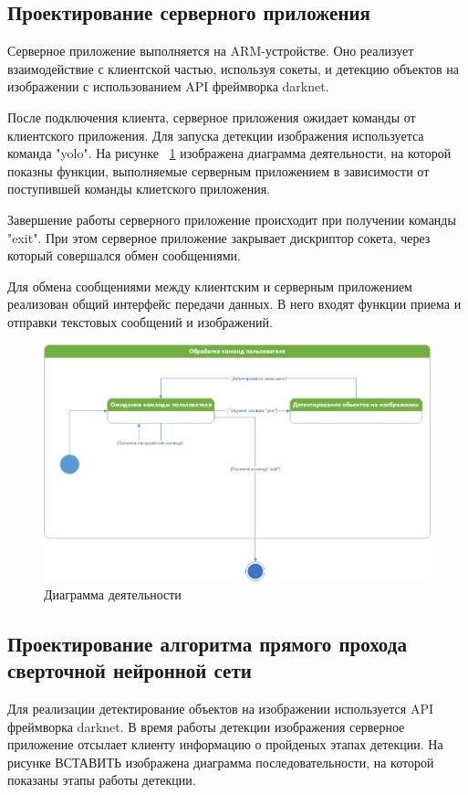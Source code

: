 \documentclass[a4paper,english,russian]{G2-105}
\begin{document}
\subsection{Проектирование серверного приложения}
\par Серверное приложение выполняется на ARM-устройстве. Оно реализует взаимодействие с клиентской частью, используя сокеты, и детекцию объектов на изображении с использованием API фреймворка darknet.
\par После подключения клиента, серверное приложения ожидает команды от клиентского приложения. Для запуска детекции изображения используетса команда "yolo". На рисунке ~\ref{state} изображена диаграмма деятельности, на которой показны функции, выполняемые серверным приложением в зависимости от поступившей команды клиетского приложения.
\par Завершение работы серверного приложение происходит при получении команды "exit". При этом серверное приложение закрывает дискриптор сокета, через который совершался обмен сообщениями.
\par Для обмена сообщениями между клиентским и серверным приложением реализован общий интерфейс передачи данных. В него входят функции приема и отправки текстовых сообщений и изображений.
\begin{figure}
    \includegraphics[width=0.6\linewidth]{statediagramserver.png}
    \caption{Диаграмма деятельности}
	\label{state}
\end{figure}
\ttl
\subsection{Проектирование алгоритма прямого прохода сверточной нейронной сети}
\par Для реализации детектирование объектов на изображении используется API фреймворка darknet. В время работы детекции изображения серверное приложение отсылает клиенту информацию о пройденых этапах детекции. На рисунке ВСТАВИТЬ изображена диаграмма последовательности, на которой показаны этапы работы детекции.
\ttl
\end{document}
